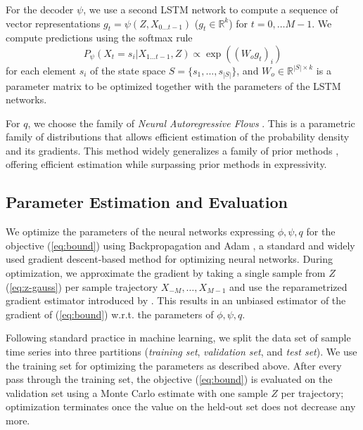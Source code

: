 \documentclass[entropy,article,submit,moreauthors,pdftex,10pt,a4paper]{Definitions/mdpi}
\newif \ifcomment
\newcommand\rljf[1]{\ifcomment{{\color{blue}(#1)}}\else{}\fi}
\begin{document}
For the decoder $\psi$, we use a second LSTM network to compute a sequence of vector representations $g_t = \psi(Z, X_{0\dots t-1})$ ($g_t \in \mathbb{R}^k$) for $t = 0, \dots M-1$.
We compute predictions using the softmax rule 
\begin{equation}
	P_\psi(X_t = s_i|X_{1...t-1}, Z) \propto \exp((W_o g_t)_i)
\end{equation}
for each element $s_i$ of the state space $S = \{s_1, ..., s_{|S|}\}$, and $W_o \in \mathbb{R}^{|S| \times k}$ is a parameter matrix to be optimized together with the parameters of the LSTM networks.


For $q$, we choose the family of \emph{Neural Autoregressive Flows} \citep{huang-neural-2018}. 
This is a parametric family of distributions that allows efficient estimation of the probability density and its gradients.
This method widely generalizes a family of prior methods \citep{rezende-variational-2015, kingma-improving-2016, papamakarios-masked-2017}, offering efficient estimation while surpassing prior methods in expressivity.


\subsection{Parameter Estimation and Evaluation}
We optimize the parameters of the neural networks expressing $\phi, \psi, q$ for the objective (\ref{eq:bound}) using Backpropagation and Adam \citep{kingma-adam:-2014}, a standard and widely used gradient descent-based method for optimizing neural networks.
During optimization, we approximate the gradient by taking a single sample from $Z$ (\ref{eq:z-gauss}) per sample trajectory $X_{-M}, \dots, X_{M-1}$ and use the reparametrized gradient estimator introduced by \citet{kingma-auto-encoding-2014}.
This results in an unbiased estimator of the gradient of (\ref{eq:bound}) w.r.t. the parameters of $\phi, \psi, q$.

Following standard practice in machine learning, we split the data set of sample time series into three partitions (\emph{training set}, \emph{validation set}, and \emph{test set}). \rljf{what proportions}
We use the training set for optimizing the parameters as described above.
After every pass through the training set, the objective (\ref{eq:bound}) is evaluated on the validation set using a Monte Carlo estimate with one sample $Z$ per trajectory; optimization terminates once the value on the held-out set does not decrease any more.
\end{document}
